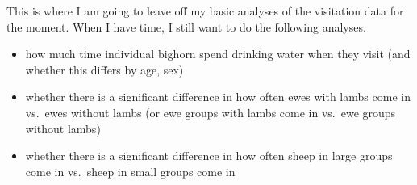 \documentclass[]{article}
\providecommand{\tightlist}{%
  \setlength{\itemsep}{0pt}\setlength{\parskip}{0pt}}
\begin{document}
This is where I am going to leave off my basic analyses of the
visitation data for the moment. When I have time, I still want to do the
following analyses.

\begin{itemize}
\tightlist
\item
  how much time individual bighorn spend drinking water when they visit
  (and whether this differs by age, sex)
\item
  whether there is a significant difference in how often ewes with lambs
  come in vs.~ewes without lambs (or ewe groups with lambs come in
  vs.~ewe groups without lambs)
\item
  whether there is a significant difference in how often sheep in large
  groups come in vs.~sheep in small groups come in
\end{itemize}
\end{document}
